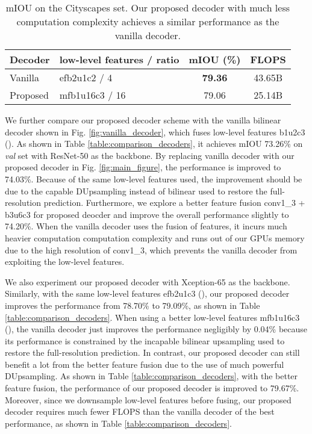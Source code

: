 \documentclass[10pt,twocolumn,letterpaper]{article}
\newcommand{\1}{{\mathbbm{1}}}
\begin{document}
\begin{table}
\begin{center}
\small
\begin{tabular}{  l|l|c|c  }
\hline
Decoder & low-level features / ratio & mIOU (\%) & FLOPS \\
\hline\hline
Vanilla & efb2u1c2 / 4 & \textbf{79.36} & 43.65B \\
Proposed & mfb1u16c3 / 16 & 79.06 & 25.14B \\
\hline
\end{tabular}
\end{center}
\caption{mIOU on the Cityscapes  set. Our proposed decoder with much less computation complexity achieves a similar performance as the vanilla decoder.}
\label{table:comparison_decoders_cityscapes}
\end{table}

We further compare our proposed decoder scheme with the vanilla bilinear decoder shown in Fig. \ref{fig:vanilla_decoder}, which fuses low-level features b1u2c3 (). As shown in Table \ref{table:comparison_decoders}, it achieves mIOU 73.26\% on {\it val} set with ResNet-50 as the backbone. By replacing vanilla decoder with our proposed decoder in Fig. \ref{fig:main_figure}, the performance is improved to 74.03\%. Because of the same low-level features used, the improvement should be due to the capable DUpsampling instead of bilinear used to restore the full-resolution prediction. Furthermore, we explore a better feature fusion conv1\_3 + b3u6c3 for proposed deocder and improve the overall performance slightly to 74.20\%. When the vanilla decoder uses the fusion of features, it incurs much heavier computation computation complexity and runs out of our GPUs memory due to the high resolution of conv1\_3, which prevents the vanilla decoder from exploiting the low-level features.

We also experiment our proposed decoder with Xception-65 as the backbone. Similarly, with the same low-level features efb2u1c3 (), our proposed decoder improves the performance from 78.70\% to 79.09\%, as shown in Table \ref{table:comparison_decoders}. When using a better low-level features mfb1u16c3 (), the vanilla decoder just improves the performance negligibly by 0.04\% because its performance is constrained by the incapable bilinear upsampling used to restore the full-resolution prediction. In contrast, our proposed decoder can still benefit a lot from the better feature fusion due to the use of much powerful DUpsampling. As shown in Table \ref{table:comparison_decoders}, with the better feature fusion, the performance of our proposed decoder is improved to 79.67\%. Moreover, since we downsample low-level features before fusing, our proposed decoder requires much fewer FLOPS than the vanilla decoder of the best performance, as shown in Table \ref{table:comparison_decoders}.
\end{document}
